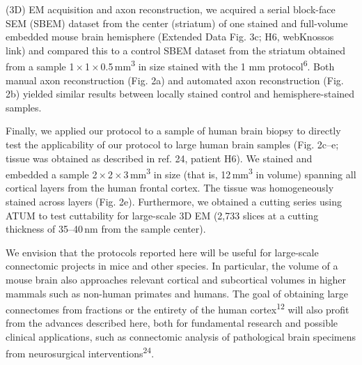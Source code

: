 \documentclass{article}
\begin{document}

(3D) EM acquisition and axon reconstruction, we acquired a serial block-face SEM (SBEM) dataset from the center (striatum) of one stained and full-volume embedded mouse brain hemisphere (Extended Data Fig. 3c; H6, webKnossos link) and compared this to a control SBEM dataset from the striatum obtained from a sample 1\,×\,1\,×\,0.5\,mm\textsuperscript{3} in size stained with the 1 mm protocol\textsuperscript{6}. Both manual axon reconstruction (Fig. 2a) and automated axon reconstruction (Fig. 2b) yielded similar results between locally stained control and hemisphere-stained samples.

Finally, we applied our protocol to a sample of human brain biopsy to directly test the applicability of our protocol to large human brain samples (Fig. 2c–e; tissue was obtained as described in ref. 24, patient H6). We stained and embedded a sample 2\,×\,2\,×\,3\,mm\textsuperscript{3} in size (that is, 12\,mm\textsuperscript{3} in volume) spanning all cortical layers from the human frontal cortex. The tissue was homogeneously stained across layers (Fig. 2e). Furthermore, we obtained a cutting series using ATUM to test cuttability for large-scale 3D EM (2,733 slices at a cutting thickness of 35–40\,nm from the sample center).

We envision that the protocols reported here will be useful for large-scale connectomic projects in mice and other species. In particular, the volume of a mouse brain also approaches relevant cortical and subcortical volumes in higher mammals such as non-human primates and humans. The goal of obtaining large connectomes from fractions or the entirety of the human cortex\textsuperscript{12} will also profit from the advances described here, both for fundamental research and possible clinical applications, such as connectomic analysis of pathological brain specimens from neurosurgical interventions\textsuperscript{24}.
\end{document}
